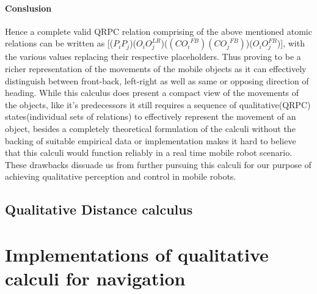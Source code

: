 	\paragraph{Conslusion}Hence a complete valid QRPC relation comprising of the above mentioned atomic relations can be written as [($P_iP_j$)($O_iO_j^{LR}$)($({CO_i}^{FB})({CO_j}^{FB})$)($O_iO_j^{FB}$)], with the various values replacing their respective placeholders. Thus proving to be a richer representation of the movements of the mobile objects as it can effectively distinguish  between front-back, left-right as well as same or opposing direction of heading. While this calculus does present a compact view of the movements of the objects, like it's predecessors it still requires a sequence of qualitative(QRPC) states(individual sets of relations) to effectively represent the movement of an object, besides a completely theoretical formulation of the calculi without the backing of suitable empirical data or implementation makes it hard to believe that this calculi would function reliably in a real time mobile robot scenario. These drawbacks dissuade us from further pursuing this calculi for our purpose of achieving qualitative perception and control in mobile robots. 
	
	\subsection{Qualitative Distance calculus}
	\paragraph{\cite{clementini1997qualitative}}
	

	\section{Implementations of qualitative calculi for navigation}
	
